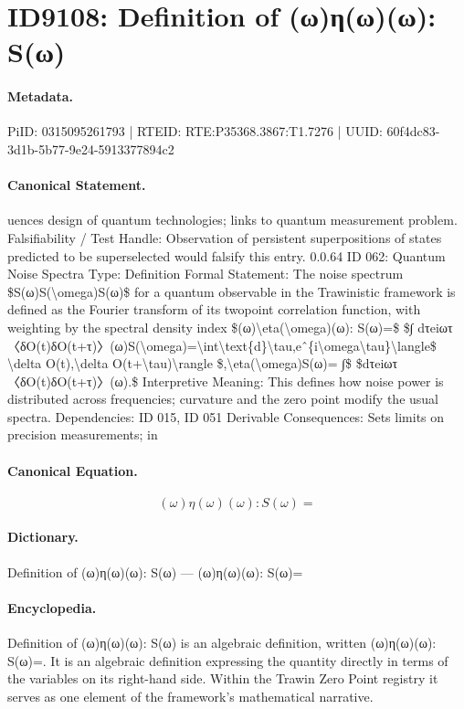 \section*{ID9108: Definition of (ω)η(ω)(ω): S(ω)}
\paragraph{Metadata.}
PiID: 0315095261793 | RTEID: RTE:P35368.3867:T1.7276 | UUID: 60f4dc83-3d1b-5b77-9e24-5913377894c2

\paragraph{Canonical Statement.}
uences design of quantum technologies; links to quantum measurement problem. Falsifiability / Test Handle: Observation of persistent superpositions of states predicted to be superselected would falsify this entry. 0.0.64 ID 062: Quantum Noise Spectra Type: Definition Formal Statement: The noise spectrum \$S(ω)S(\textbackslash{}omega)S(ω)\$ for a quantum observable in the Trawinistic framework is defined as the Fourier transform of its twopoint correlation function, with weighting by the spectral density index \$(ω)\textbackslash{}eta(\textbackslash{}omega)(ω): S(ω)=\$ \$∫ dτeiωτ〈δO(t)δO(t+τ)〉(ω)S(\textbackslash{}omega)=\textbackslash{}int\textbackslash{}text\{d\}\textbackslash{}tau,eˆ\{i\textbackslash{}omega\textbackslash{}tau\}\textbackslash{}langle\$ \textbackslash{}delta O(t),\textbackslash{}delta O(t+\textbackslash{}tau)\textbackslash{}rangle \$,\textbackslash{}eta(\textbackslash{}omega)S(ω)= ∫\$ \$dτeiωτ〈δO(t)δO(t+τ)〉(ω).\$ Interpretive Meaning: This defines how noise power is distributed across frequencies; curvature and the zero point modify the usual spectra. Dependencies: ID 015, ID 051 Derivable Consequences: Sets limits on precision measurements; in

\paragraph{Canonical Equation.}
\[
(ω)\eta(\omega)(ω): S(ω)=
\]

\paragraph{Dictionary.}
Definition of (ω)η(ω)(ω): S(ω) — (ω)η(ω)(ω): S(ω)=

\paragraph{Encyclopedia.}
Definition of (ω)η(ω)(ω): S(ω) is an algebraic definition, written (ω)η(ω)(ω): S(ω)=. It is an algebraic definition expressing the quantity directly in terms of the variables on its right-hand side. Within the Trawin Zero Point registry it serves as one element of the framework's mathematical narrative.

